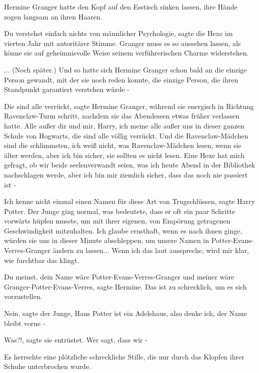 Hermine Granger hatte den Kopf auf den Esstisch sinken lassen, ihre Hände zogen
langsam an ihren Haaren.

\glqq{}Du verstehst einfach nichts von männlicher Psychologie\grqq{}, sagte die
Hexe im vierten Jahr mit autoritärer Stimme. \glqq{}Granger muss es so aussehen
lassen, als könne sie auf geheimnisvolle Weise seinem verführerischen Charme
widerstehen.\grqq{}

... (Noch später.) Und so hatte sich Hermine Granger schon bald an die einzige
Person gewandt, mit der sie noch reden konnte, die einzige Person, die ihren
Standpunkt garantiert verstehen würde -

\glqq{}Die sind alle verrückt\grqq{}, sagte Hermine Granger, während sie
energisch in Richtung Ravenclaw-Turm schritt, nachdem sie das Abendessen etwas
früher verlassen hatte. \glqq{}Alle außer dir und mir, Harry, ich meine alle
außer uns in dieser ganzen Schule von Hogwarts, die sind alle völlig verrückt.
Und die Ravenclaw-Mädchen sind die schlimmsten, ich weiß nicht, was
Ravenclaw-Mädchen lesen, wenn sie älter werden, aber ich bin sicher, sie sollten
es nicht lesen. Eine Hexe hat mich gefragt, ob wir beide seelenverwandt seien,
was ich heute Abend in der Bibliothek nachschlagen werde, aber ich bin mir
ziemlich sicher, dass das noch nie passiert ist -\grqq{}

\glqq{}Ich kenne nicht einmal einen Namen für diese Art von Trugschlüssen\grqq{},
sagte Harry Potter. Der Junge ging normal, was bedeutete, dass er oft ein paar
Schritte vorwärts hüpfen musste, um mit ihrer eigenen, von Empörung getragenen
Geschwindigkeit mitzuhalten. \glqq{}Ich glaube ernsthaft, wenn es nach ihnen
ginge, würden sie uns in dieser Minute abschleppen, um unsere Namen in
Potter-Evans-Verres-Granger ändern zu lassen... Wenn ich das laut ausspreche,
wird mir klar, wie furchtbar das klingt.\grqq{}

\glqq{}Du meinst, dein Name wäre Potter-Evans-Verres-Granger und meiner wäre
Granger-Potter-Evans-Verres\grqq{}, sagte Hermine. \glqq{}Das ist zu schrecklich,
um es sich vorzustellen.\grqq{}

\glqq{}Nein\grqq{}, sagte der Junge, \glqq{}Haus Potter ist ein Adelshaus, also
denke ich, der Name bleibt vorne -\grqq{}

\glqq{}Was?!\grqq{}, sagte sie entrüstet. \glqq{}Wer sagt, dass wir -\grqq{}

Es herrschte eine plötzliche schreckliche Stille, die nur durch das Klopfen
ihrer Schuhe unterbrochen wurde.

